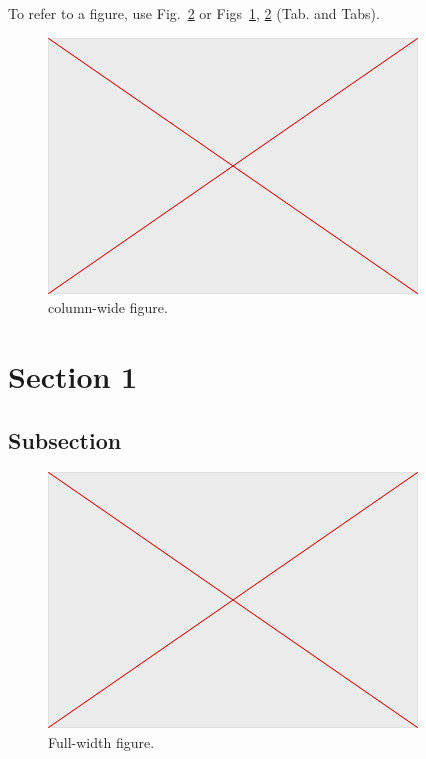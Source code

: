 \documentclass[breakmath,report,languages={french,japanese,arabic}]{seismica}
\begin{document}
	To refer to a figure, use Fig.~\ref{fig:2} or Figs~\ref{fig:1}, \ref{fig:2} (Tab. and Tabs).
	
	\begin{figure}[ht!]
		\includegraphics[width=\columnwidth]{empty} 
		\caption{column-wide figure.}
		\label{fig:1}
	\end{figure}
	
	\section{Section 1}
	
	\subsection{Subsection }
	
	\begin{figure}[ht!]
		\includegraphics[width=\textwidth]{empty} 
		\caption{Full-width figure.}
		\label{fig:2}
	\end{figure}
\end{document}
